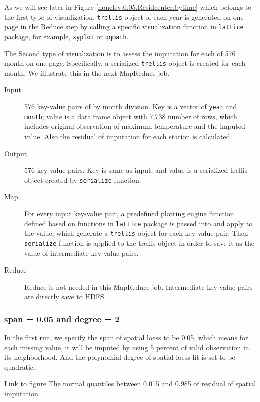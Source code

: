 As we will see later in Figure 
\href{../plots/a1950/spaimpute/nonelev/span0.05/a1950.spaResidcenter.bytime.pdf}
{\ref*{nonelev.0.05.Residcenter.bytime}} which belongs to the first type of 
visualization, \texttt{trellis} object of each year is generated on one page in 
the Reduce step by calling a specific visualization function in \texttt{lattice} 
package, for example, \texttt{xyplot} or \texttt{qqmath}.

The Second type of visualization is to assess the imputation for each of 576 month
on one page. Specifically, a serialized \texttt{trellis} object is created for 
each month. We illustrate this in the next MapReduce job.

\begin{description}
  \item[Input] 576 key-value pairs of by month division. Key is a vector of
  \texttt{year} and \texttt{month}; value is a data.frame object with 7,738 
  number of rows, which includes original observation of maximum temperature
  and the imputed value. Also the residual of imputation for each station is 
  calculated.
  \item[Output] 576 key-value pairs. Key is same as input, and value is a serialized
  trellis object created by \texttt{serialize} function.
  \item[Map]For every input key-value pair, a predefined plotting engine function
  defined based on functions in \texttt{lattice} package is passed into and apply 
  to the value, which generate a \texttt{trellis} object for each key-value pair. 
  Then \texttt{serialize} function is applied to the trellis object in order to 
  save it as the value of intermediate key-value pairs.
  \item[Reduce] Reduce is not needed in this MapReduce job. Intermediate key-value
  pairs are directly save to HDFS.
\end{description}

\subsubsection{span = 0.05 and degree = 2}

In the first run, we specify the span of spatial loess to be 0.05, which means
for each missing value, it will be imputed by using 5 percent of valid observation
in its neighborhood. And the polynomial degree of spatial loess fit is set to be
quadratic.

\begin{framed}
\begin{center}
  \href{../plots/a1950/spaimpute/nonelev/span0.05/a1950.spaResidcenter.bytime.pdf}
  {Link to figure}
  {The normal quantiles between 0.015 and 0.985 of residual of spatial imputation}
  \label{nonelev.0.05.Residcenter.bytime}
\end{center}
\end{framed}

